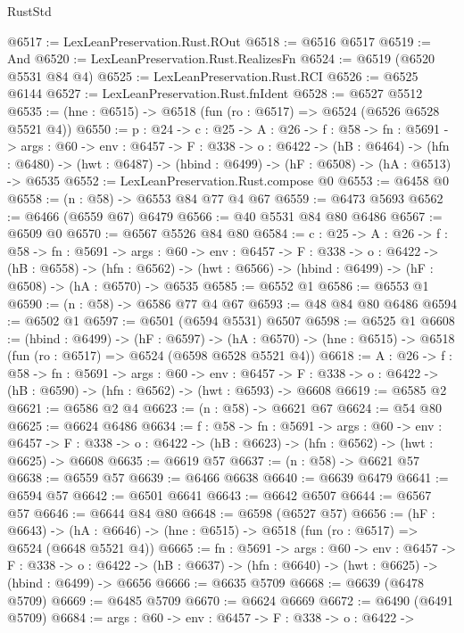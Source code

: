 \begin{lexlean}{RustStd}
\begin{coremodule}
@6517 := LexLeanPreservation.Rust.ROut
@6518 := @6516 @6517
@6519 := And
@6520 := LexLeanPreservation.Rust.RealizesFn
@6524 := @6519 (@6520 @5531 @84 @4)
@6525 := LexLeanPreservation.Rust.RCI
@6526 := @6525 @6144
@6527 := LexLeanPreservation.Rust.fnIdent
@6528 := @6527 @5512
@6535 := (hne : @6515) -> @6518 (fun (ro : @6517) => @6524 (@6526 @6528 @5521 @4))
@6550 := {p : @24} ->
  {c : @25} ->
  {A : @26} ->
  {f : @58} ->
  {fn : @5691} ->
  {args : @60} ->
  {env : @6457} ->
  {F : @338} ->
  {o : @6422} ->
  (hB : @6464) ->
  (hfn : @6480) -> (hwt : @6487) -> (hbind : @6499) -> (hF : @6508) -> (hA : @6513) -> @6535
@6552 := LexLeanPreservation.Rust.compose @0
@6553 := @6458 @0
@6558 := (n : @58) -> @6553 @84 @77 @4 @67
@6559 := @6473 @5693
@6562 := @6466 (@6559 @67) @6479
@6566 := @40 @5531 @84 @80 @6486
@6567 := @6509 @0
@6570 := @6567 @5526 @84 @80
@6584 := {c : @25} ->
  {A : @26} ->
  {f : @58} ->
  {fn : @5691} ->
  {args : @60} ->
  {env : @6457} ->
  {F : @338} ->
  {o : @6422} ->
  (hB : @6558) ->
  (hfn : @6562) -> (hwt : @6566) -> (hbind : @6499) -> (hF : @6508) -> (hA : @6570) -> @6535
@6585 := @6552 @1
@6586 := @6553 @1
@6590 := (n : @58) -> @6586 @77 @4 @67
@6593 := @48 @84 @80 @6486
@6594 := @6502 @1
@6597 := @6501 (@6594 @5531) @6507
@6598 := @6525 @1
@6608 := (hbind : @6499) ->
  (hF : @6597) ->
  (hA : @6570) -> (hne : @6515) -> @6518 (fun (ro : @6517) => @6524 (@6598 @6528 @5521 @4))
@6618 := {A : @26} ->
  {f : @58} ->
  {fn : @5691} ->
  {args : @60} ->
  {env : @6457} ->
  {F : @338} -> {o : @6422} -> (hB : @6590) -> (hfn : @6562) -> (hwt : @6593) -> @6608
@6619 := @6585 @2
@6621 := @6586 @2 @4
@6623 := (n : @58) -> @6621 @67
@6624 := @54 @80
@6625 := @6624 @6486
@6634 := {f : @58} ->
  {fn : @5691} ->
  {args : @60} ->
  {env : @6457} ->
  {F : @338} -> {o : @6422} -> (hB : @6623) -> (hfn : @6562) -> (hwt : @6625) -> @6608
@6635 := @6619 @57
@6637 := (n : @58) -> @6621 @57
@6638 := @6559 @57
@6639 := @6466 @6638
@6640 := @6639 @6479
@6641 := @6594 @57
@6642 := @6501 @6641
@6643 := @6642 @6507
@6644 := @6567 @57
@6646 := @6644 @84 @80
@6648 := @6598 (@6527 @57)
@6656 := (hF : @6643) ->
  (hA : @6646) -> (hne : @6515) -> @6518 (fun (ro : @6517) => @6524 (@6648 @5521 @4))
@6665 := {fn : @5691} ->
  {args : @60} ->
  {env : @6457} ->
  {F : @338} ->
  {o : @6422} -> (hB : @6637) -> (hfn : @6640) -> (hwt : @6625) -> (hbind : @6499) -> @6656
@6666 := @6635 @5709
@6668 := @6639 (@6478 @5709)
@6669 := @6485 @5709
@6670 := @6624 @6669
@6672 := @6490 (@6491 @5709)
@6684 := {args : @60} ->
  {env : @6457} ->
  {F : @338} ->
  {o : @6422} ->

\end{coremodule}
\end{lexlean}
